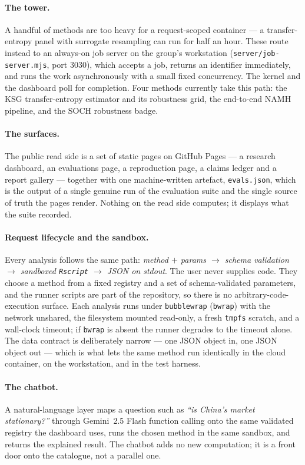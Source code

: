 \documentclass[11pt]{article}
\newcommand{\code}[1]{\texttt{\small #1}}
\newcommand{\arrowto}{$\rightarrow$}
\begin{document}
\paragraph{The tower.} A handful of methods are too heavy for a request-scoped
container --- a transfer-entropy panel with surrogate resampling can run for
half an hour. These route instead to an always-on job server on the group's
workstation (\code{server/job-server.mjs}, port 3030), which accepts a job,
returns an identifier immediately, and runs the work asynchronously with a small
fixed concurrency. The kernel and the dashboard poll for completion. Four
methods currently take this path: the KSG transfer-entropy estimator and its
robustness grid, the end-to-end NAMH pipeline, and the SOCH robustness badge.

\paragraph{The surfaces.} The public read side is a set of static pages on
GitHub Pages --- a research dashboard, an evaluations page, a reproduction page,
a claims ledger and a report gallery --- together with one machine-written
artefact, \code{evals.json}, which is the output of a single genuine run of the
evaluation suite and the single source of truth the pages render. Nothing on the
read side computes; it displays what the suite recorded.

\paragraph{Request lifecycle and the sandbox.} Every analysis follows the same
path: \emph{method $+$ params \arrowto{} schema validation \arrowto{} sandboxed
\code{Rscript} \arrowto{} JSON on stdout}. The user never supplies code. They
choose a method from a fixed registry and a set of schema-validated parameters,
and the runner scripts are part of the repository, so there is no
arbitrary-code-execution surface. Each analysis runs under \code{bubblewrap}
(\code{bwrap}) with the network unshared, the filesystem mounted read-only, a
fresh \code{tmpfs} scratch, and a wall-clock timeout; if \code{bwrap} is absent
the runner degrades to the timeout alone. The data contract is deliberately
narrow --- one JSON object in, one JSON object out --- which is what lets the
same method run identically in the cloud container, on the workstation, and in
the test harness.

\paragraph{The chatbot.} A natural-language layer maps a question such as
\emph{``is China's market stationary?''} through Gemini~2.5 Flash function
calling onto the same validated registry the dashboard uses, runs the chosen
method in the same sandbox, and returns the explained result. The chatbot adds
no new computation; it is a front door onto the catalogue, not a parallel one.
\end{document}
